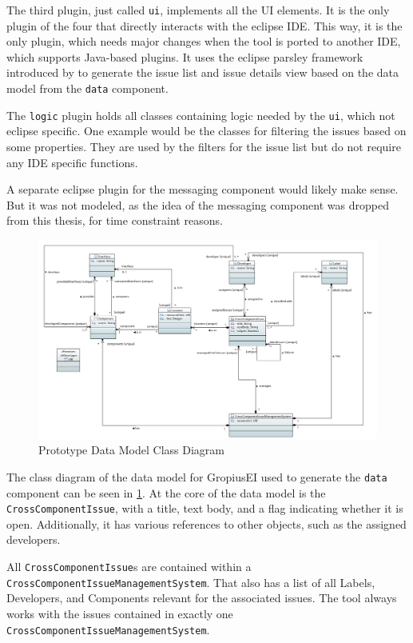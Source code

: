 The third plugin, just called \lstinline|ui|, implements all the \gls{UI} elements.
It is the only plugin of the four that directly interacts with the eclipse \gls{IDE}.
This way, it is the only plugin, which needs major changes when the tool is ported to another \gls{IDE}, which supports Java-based plugins.
It uses the eclipse parsley framework introduced by \cite{bettini2014developing} to generate the issue list and issue details view 
based on the data model from the \lstinline|data| component.

The \lstinline|logic| plugin holds all classes containing logic needed by the \lstinline|ui|, which not eclipse specific.
One example would be the classes for filtering the issues based on some properties.
They are used by the filters for the issue list but do not require any \gls{IDE} specific functions.

A separate eclipse plugin for the messaging component would likely make sense.
But it was not modeled, as the idea of the messaging component was dropped from this thesis, for time constraint reasons.

\begin{figure}[!h]
	\centering
	\includegraphics[width=\textwidth]{graphics/dataClassDiagram.png}
	\caption{Prototype Data Model Class Diagram}
	\label{fig:c4:data_class_diagram}
\end{figure}
The class diagram of the data model for \gls{GropiusEI} used to generate the \lstinline|data| component can be seen in \cref{fig:c4:data_class_diagram}.
At the core of the data model is the \lstinline|CrossComponentIssue|, with a title, text body, and a flag indicating whether it is open.
Additionally, it has various references to other objects, such as the assigned developers.

All \lstinline|CrossComponentIssue|s are contained within a \lstinline|CrossComponentIssueManagementSystem|.
That also has a list of all Labels, Developers, and Components relevant for the associated issues.
The tool always works with the issues contained in exactly one \lstinline|CrossComponentIssueManagementSystem|.


